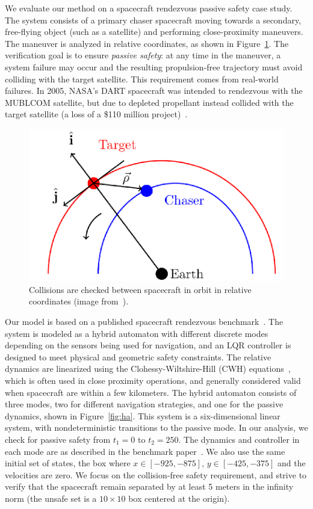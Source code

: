 We evaluate our method on a spacecraft rendezvous passive safety case study.
%
The system consists of a primary chaser spacecraft moving towards a secondary, free-flying object (such as a satellite) and performing close-proximity maneuvers.
%
The maneuver is analyzed in relative coordinates, as shown in Figure~\ref{fig:chaser}.
%
The verification goal is to ensure \emph{passive safety}: at any time in the maneuver, a system failure may occur and the resulting propulsion-free trajectory must avoid colliding with the target satellite.
%
This requirement comes from real-world failures. In 2005, NASA's DART spacecraft was intended to rendezvous with the MUBLCOM satellite, but due to depleted propellant instead collided with the target satellite (a loss of a
\$110 million project)~\cite{croomes2006overview}.

\begin{figure}[t]
\centerline{\includegraphics[width=0.5\columnwidth]{images/chaser.png}}
\caption{Collisions are checked between spacecraft in orbit in relative coordinates (image from~\cite{chan2017verifying}).}
\label{fig:chaser}
\end{figure}


Our model is based on a published spacecraft rendezvous benchmark~\cite{chan2017verifying,jewison2016spacecraft}.
%
The system is modeled as a hybrid automaton with different discrete modes depending on the sensors being used for navigation, and an LQR controller is designed to meet physical and geometric safety constraints.
%
The relative dynamics are linearized using the Clohessy-Wiltshire-Hill (CWH) equations~\cite{wh1960terminal},
which is often used in close proximity operations, and generally considered valid when spacecraft are within a few kilometers.
%
The hybrid automaton consists of three modes, two for different navigation strategies, and one for the passive dynamics, shown in Figure~\ref{fig:ha}.
%
This system is a six-dimensional linear system, with nondeterministic transitions to the passive mode.
%
In our analysis, we check for passive safety from $t_1=0$ to $t_2=250$.
%
The dynamics and controller in each mode are as described in the benchmark paper~\cite{chan2017verifying}.
%
We also use the same initial set of states, the box where $x \in [-925, -875]$, $y \in [-425, -375]$ and the velocities are zero.
%
We focus on the collision-free safety requirement, and strive to verify that the spacecraft remain separated by at least
5 meters in the infinity norm (the unsafe set is a $10 \times 10$ box centered at the origin).

